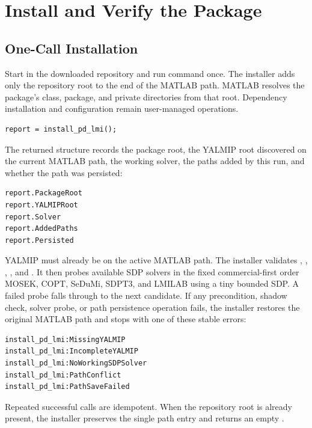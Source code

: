 \chapter{Install and Verify the Package}
\label{sec:setup}

\section{One-Call Installation}
\label{sec:installation}

Start \matlab{} in the downloaded repository and run command  once. The installer adds only the repository root to the end of the MATLAB path. MATLAB resolves the package's class, package, and private directories from that root. Dependency installation and  configuration remain user-managed operations.

\begin{lstlisting}[style=dpmatlab]
report = install_pd_lmi();
\end{lstlisting}

The returned structure records the package root, the YALMIP root discovered on the current MATLAB path, the working  solver, the paths added by this run, and whether the path was persisted:

\begin{lstlisting}[style=dpsyntax]
report.PackageRoot
report.YALMIPRoot
report.Solver
report.AddedPaths
report.Persisted
\end{lstlisting}

YALMIP must already be on the active MATLAB path. The installer validates , , , , and . It then probes available SDP solvers in the fixed commercial-first order MOSEK, COPT, SeDuMi, SDPT3, and LMILAB using a tiny bounded SDP. A failed probe falls through to the next candidate. If any precondition, shadow check, solver probe, or path persistence operation fails, the installer restores the original MATLAB path and stops with one of these stable errors:

\begin{lstlisting}[style=dpsyntax]
install_pd_lmi:MissingYALMIP
install_pd_lmi:IncompleteYALMIP
install_pd_lmi:NoWorkingSDPSolver
install_pd_lmi:PathConflict
install_pd_lmi:PathSaveFailed
\end{lstlisting}

Repeated successful calls are idempotent. When the repository root is already present, the installer preserves the single path entry and returns an empty .

